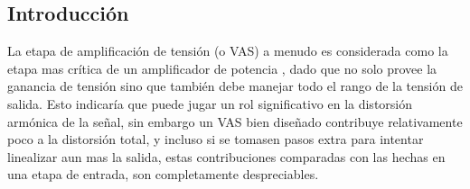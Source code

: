 



\subsection{Introducción}
La etapa de amplificación de tensión (o VAS) a menudo es considerada como la etapa mas crítica de un amplificador de potencia , dado que no solo provee la ganancia de tensión sino que también debe manejar todo el rango de la tensión de salida. Esto indicaría que puede jugar un rol significativo en la distorsión armónica de la señal, sin embargo un VAS bien diseñado contribuye relativamente poco a la distorsión total, y incluso si se tomasen pasos extra para intentar linealizar aun mas la salida, estas contribuciones comparadas con las hechas en una etapa de entrada, son completamente despreciables.\\

